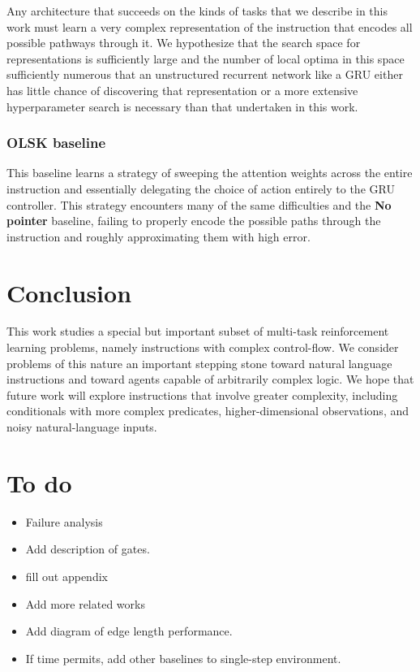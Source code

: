 \documentclass{article}
\begin{document}
Any architecture that succeeds on the kinds of tasks that we describe in this
work must learn a very complex representation of the instruction that encodes
all possible pathways through it. We hypothesize that the search space for
representations is sufficiently large and the number of local optima in this
space sufficiently numerous that an unstructured recurrent network like a GRU
either has little chance of discovering that representation or a more extensive
hyperparameter search is necessary than that undertaken in this work.

\subsubsection{OLSK baseline}
This baseline learns a strategy of sweeping the attention weights across
the entire instruction and essentially delegating the choice of action entirely
to the GRU controller. This strategy encounters many of the same difficulties
and the \textbf{No pointer} baseline, failing to properly encode the possible
paths through the instruction and roughly approximating them with high error.

\section{Conclusion}
This work studies a special but important subset of multi-task reinforcement
learning problems, namely instructions with complex control-flow. We consider
problems of this nature an important stepping stone toward natural language
instructions and toward agents capable of arbitrarily complex logic. We hope
that future work will explore instructions that involve greater complexity,
including conditionals with more complex predicates, higher-dimensional
observations, and noisy natural-language inputs.

\section{To do}
\begin{itemize}
  \item Failure analysis
  \item Add description of gates.
  \item fill out appendix
  \item Add more related works
  \item Add diagram of edge length performance.
  \item If time permits, add other baselines to single-step environment.
\end{itemize}
\end{document}
